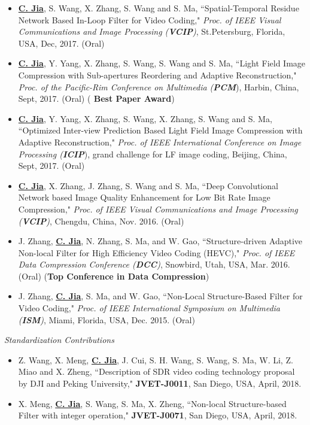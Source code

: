 \documentclass[margin, 10pt]{res} %
\begin{document}
\begin{resume}
\begin{itemize}
\item{\underline{\bf C. Jia}, S. Wang, X. Zhang, S. Wang and S. Ma, ``Spatial-Temporal Residue Network Based In-Loop Filter for Video Coding," {\em Proc. of IEEE Visual Communications and Image Processing ({\bf VCIP})}, St.Petersburg, Florida, USA, Dec, 2017. (Oral)}

\item{\underline{\bf C. Jia}, Y. Yang, X. Zhang, S. Wang, S. Wang and S. Ma, ``Light Field Image Compression with Sub-apertures Reordering and Adaptive Reconstruction," {\em Proc. of the Pacific-Rim Conference on Multimedia ({\bf PCM}}), Harbin, China, Sept, 2017. (Oral)} ({\bf{\color{red} Best Paper Award}})

\item{\underline{\bf C. Jia}, Y. Yang, X. Zhang, S. Wang, X. Zhang, S. Wang and S. Ma, ``Optimized Inter-view Prediction Based Light Field Image Compression with Adaptive Reconstruction," {\em Proc. of IEEE International Conference on Image Processing ({\bf ICIP}}), grand challenge for LF image coding, Beijing, China, Sept, 2017. (Oral)}

\item{\underline{\bf C. Jia}, X. Zhang, J. Zhang, S. Wang and S. Ma, ``Deep Convolutional Network based Image Quality Enhancement for Low Bit Rate Image Compression," {\em Proc. of IEEE Visual Communications and Image Processing ({\bf VCIP})}, Chengdu, China, Nov. 2016. (Oral)}

\item{J. Zhang, \underline{\bf C. Jia},  N. Zhang, S. Ma, and W. Gao, ``Structure-driven Adaptive Non-local Filter for High Efficiency Video Coding (HEVC)," {\em Proc. of IEEE Data Compression Conference ({\bf DCC})}, Snowbird, Utah, USA, Mar. 2016. (Oral) ({\bf Top Conference in Data Compression})}

\item{J. Zhang, \underline{\bf C. Jia}, S. Ma, and W. Gao, ``Non-Local Structure-Based Filter for Video Coding," {\em Proc. of IEEE International Symposium on Multimedia ({\bf ISM})}, Miami, Florida, USA, Dec. 2015. (Oral)}

\end{itemize}

{\sl Standardization Contributions}
\begin{itemize}
\item{Z. Wang, X. Meng, \underline{\bf C. Jia}, J. Cui, S. H. Wang, S. Wang, S. Ma, W. Li, Z. Miao and X. Zheng, ``Description of SDR video coding technology proposal by DJI and Peking University," {\bf JVET-J0011}, San Diego, USA, April, 2018. }
\item{X. Meng, \underline{\bf C. Jia}, S. Wang, S. Ma, X. Zheng, ``Non-local Structure-based Filter with integer operation," {\bf JVET-J0071}, San Diego, USA, April, 2018.}


\end{itemize}
\end{resume}
\end{document}
